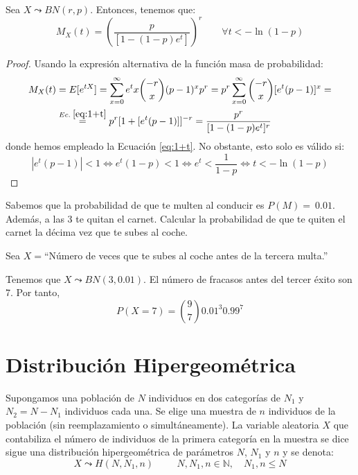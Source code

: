 \begin{prop}
    Sea $X\leadsto BN(r,p)$. Entonces, tenemos que:
    \begin{equation*}
        M_X(t)=\left(\frac{p}{[1-(1-p)e^t]}\right)^r \qquad \forall t<-\ln(1-p)
    \end{equation*}
\end{prop}
\begin{proof}
    Usando la expresión alternativa de la función masa de probabilidad:
    \begin{equation*}\begin{split}
        M_X(t)
        &=E[e^{tX}]
        = \sum_{x=0}^\infty e^tx \binom{-r}{x}(p-1)^xp^r
        = p^r\sum_{x=0}^\infty \binom{-r}{x}[e^t(p-1)]^x =\\
        & \stackrel{Ec.\;\ref{eq:1+t}}{=} p^r [1+[e^t(p-1)]]^{-r}
        = \frac{p^r}{[1-(1-p)e^t]^{r}}
    \end{split}\end{equation*}
    donde hemos empleado la Ecuación \ref{eq:1+t}. No obstante, esto solo es válido si:
    \begin{equation*}
        |e^t(p-1)|<1
        \Longleftrightarrow e^t(1-p)<1
        \Longleftrightarrow e^t < \frac{1}{1-p}
        \Longleftrightarrow t < -\ln(1-p)
    \end{equation*}
\end{proof}

\begin{ejemplo}
    Sabemos que la probabilidad de que te multen al conducir es $P(M)=~0.01$. Además, a las 3 te quitan el carnet. Calcular la probabilidad de que te quiten el carnet la décima vez que te subes al coche.

    Sea $X=$``Número de veces que te subes al coche antes de la tercera multa.''
    
    Tenemos que $X\leadsto BN(3,0.01)$. El número de fracasos antes del tercer éxito son 7. Por tanto,
    \begin{equation*}
        P(X=7) = \binom{9}{7} 0.01^3 0.99^7
    \end{equation*}
\end{ejemplo}


\section{Distribución Hipergeométrica}

\begin{definicion}
    Supongamos una población de $N$ individuos en dos categorías de $N_1$ y $N_2 =N-N_1$ individuos cada una. Se elige una muestra de $n$ individuos de la población (sin reemplazamiento o simultáneamente). La variable aleatoria $X$ que contabiliza el número de individuos de la primera categoría en la muestra se dice sigue una distribución hipergeométrica de parámetros $N$, $N_1$ y $n$ y se denota:
    \begin{equation*}
        X\leadsto H(N,N_1,n) \hspace{1cm} N,N_1,n\in \mathbb{N},\quad N_1,n\leq N
    \end{equation*}
\end{definicion}



